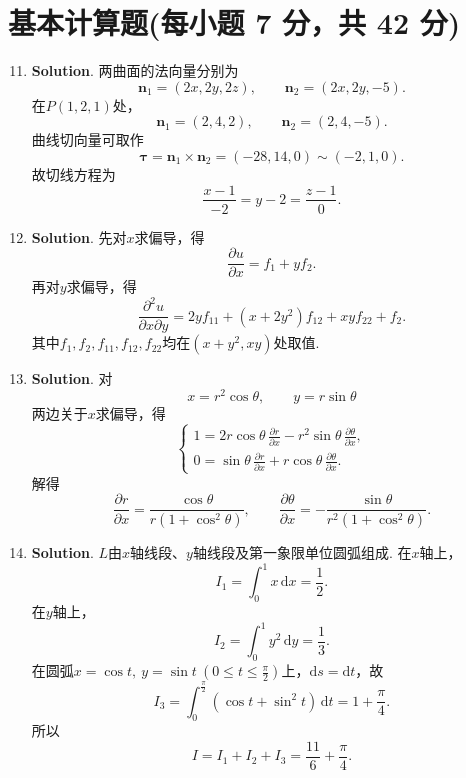 \documentclass[../main.tex]{subfiles}
\begin{document}
\section{基本计算题(每小题 7 分，共 42 分)}
\begin{enumerate}
    \setcounter{enumi}{10}
    \item \textbf{Solution}. 两曲面的法向量分别为
          \[
              \boldsymbol{n}_1=(2x,2y,2z),\qquad \boldsymbol{n}_2=(2x,2y,-5).
          \]
          在$P(1,2,1)$处，
          \[
              \boldsymbol{n}_1=(2,4,2),\qquad \boldsymbol{n}_2=(2,4,-5).
          \]
          曲线切向量可取作
          \[
              \boldsymbol{\tau}=\boldsymbol{n}_1\times\boldsymbol{n}_2=(-28,14,0)\sim(-2,1,0).
          \]
          故切线方程为
          \[
              \frac{x-1}{-2}=y-2=\frac{z-1}{0}.
          \]

    \item \textbf{Solution}. 先对$x$求偏导，得
          \[
              \frac{\partial u}{\partial x}=f_1+yf_2.
          \]
          再对$y$求偏导，得
          \[
              \frac{\partial^2 u}{\partial x\partial y}=2yf_{11}+(x+2y^2)f_{12}+xyf_{22}+f_2.
          \]
          其中$f_1,f_2,f_{11},f_{12},f_{22}$均在$(x+y^2,xy)$处取值.

    \item \textbf{Solution}. 对
          \[
              x=r^2\cos\theta,\qquad y=r\sin\theta
          \]
          两边关于$x$求偏导，得
          \[
              \begin{cases}
                  1=2r\cos\theta\,\frac{\partial r}{\partial x}-r^2\sin\theta\,\frac{\partial\theta}{\partial x}, \\
                  0=\sin\theta\,\frac{\partial r}{\partial x}+r\cos\theta\,\frac{\partial\theta}{\partial x}.
              \end{cases}
          \]
          解得
          \[
              \frac{\partial r}{\partial x}=\frac{\cos\theta}{r(1+\cos^2\theta)},\qquad
              \frac{\partial\theta}{\partial x}=-\frac{\sin\theta}{r^2(1+\cos^2\theta)}.
          \]

    \item \textbf{Solution}. $L$由$x$轴线段、$y$轴线段及第一象限单位圆弧组成. 在$x$轴上，
          \[
              I_1=\int_0^1x\,\mathrm{d}x=\frac12.
          \]
          在$y$轴上，
          \[
              I_2=\int_0^1y^2\,\mathrm{d}y=\frac13.
          \]
          在圆弧$x=\cos t,\ y=\sin t\ \left(0\le t\le\frac{\pi}{2}\right)$上，$\mathrm{d}s=\mathrm{d}t$，故
          \[
              I_3=\int_0^{\frac{\pi}{2}}(\cos t+\sin^2t)\,\mathrm{d}t=1+\frac{\pi}{4}.
          \]
          所以
          \[
              I=I_1+I_2+I_3=\frac{11}{6}+\frac{\pi}{4}.
          \]


\end{enumerate}
\end{document}
